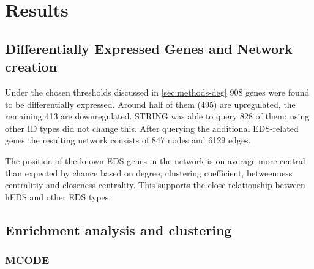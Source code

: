 \section{Results}
\subsection{Differentially Expressed Genes and Network creation}

Under the chosen thresholds discussed in \ref{sec:methods-deg} 908 genes were found to be differentially expressed. Around half of them (495) are upregulated, the remaining 413 are downregulated. STRING was able to query 828 of them; using other ID types did not change this. After querying the additional EDS-related genes the resulting network consists of 847 nodes and 6129 edges.

The position of the known EDS genes in the network is on average more central than expected by chance based on degree, clustering coefficient, betweenness centralitiy and closeness centrality. This supports the close relationship between hEDS and other EDS types.

\subsection{Enrichment analysis and clustering}

\subsubsection{MCODE}

